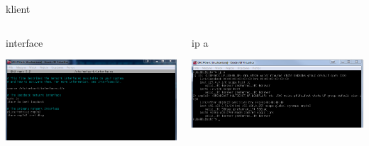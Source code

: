 \documentclass[presentation]{beamer}
\begin{document}
\begin{frame}[label={sec:org4423da7}]{klient}
\begin{columns}
\begin{column}{0.55\columnwidth}
\begin{block}{interface}
\begin{center}
\includegraphics[width=.9\linewidth]{./data/dhcp/8_1.png}
\end{center}
\end{block}
\end{column}
\begin{column}{0.55\columnwidth}
\begin{block}{ip a}
\begin{center}
\includegraphics[width=.9\linewidth]{./data/dhcp/8_2.png}
\end{center}
\end{block}
\end{column}
\end{columns}
\end{frame}
\end{document}
